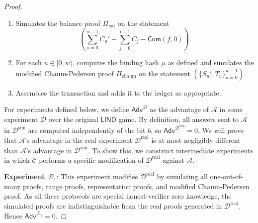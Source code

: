 \documentclass{llncs}
\newcommand{\func}[1]{\mathsf{#1}}
\newcommand{\com}{\func{Com}}
\begin{document}
\begin{proof}
\begin{itemize}
\begin{enumerate}
\begin{enumerate}
\begin{enumerate}
                \item Samples a serial number commitment $S_j$ uniformly at random.
                \item Samples a value commitment $\overline{C}_j$ uniformly at random.
                \item Samples a random input used to produce an AEAD encryption key $\func{AEADKeyGen} \to k_{\text{enc}}$.
                \item Simulates the recipient data encryption by selecting random $r$ of the proper length, and encrypting it to produce $$\func{AEADEncrypt}(k_{\text{enc}},\texttt{r},r) \to \overline{r}.$$
                \item Simulates a range proof $(\Pi_{\text{rp}})_j$ on the statement $(\overline{C}_j)$.
            \end{enumerate}
        \end{enumerate}
        \item Simulates the balance proof $\Pi_{\text{bal}}$ on the statement $$\left(\sum_{u=0}^{w-1} C_u' - \sum_{j=0}^{t-1} \overline{C}_j - \com(f,0)\right).$$
        \item For each $u \in [0,w)$, computes the binding hash $\mu$ as defined and simulates the modified Chaum-Pedersen proof $\Pi_{\text{chaum}}$ on the statement $(\{S_u', T_u\}_{u=0}^{w-1})$.
        \item Assembles the transaction and adds it to the ledger as appropriate.
    \end{enumerate}
\end{itemize}

For experiments defined below, we define $\func{Adv}^{\mathcal{D}}$ as the advantage of $\mathcal{A}$ in some experiment $\mathcal{D}$ over the original $\func{LIND}$ game.
By definition, all answers sent to $\mathcal{A}$ in $\mathcal{D}^{\text{sim}}$ are computed independently of the bit $b$, so $\func{Adv}^{\mathcal{D}^{\text{sim}}} = 0$. We will prove that $\mathcal{A}$'s advantage in the real experiment $\mathcal{D}^{\text{real}}$ is at most negligibly different than $\mathcal{A}$'s advantage in $\mathcal{D}^{\text{sim}}$.
To show this, we construct intermediate experiments in which $\mathcal{C}$ performs a specific modification of $\mathcal{D}^{\text{real}}$ against $\mathcal{A}$.

\textbf{Experiment $\mathcal{D}_1$}: This experiment modifies $\mathcal{D}^{\text{real}}$ by simulating all one-out-of-many proofs, range proofs, representation proofs, and modified Chaum-Pedersen proof.
As all these protocols are special honest-verifier zero knowledge, the simulated proofs are indistinguishable from the real proofs generated in $\mathcal{D}^{\text{real}}$.
Hence $\func{Adv}^{\mathcal{D}_1} = 0$.


\end{proof}
\end{document}
